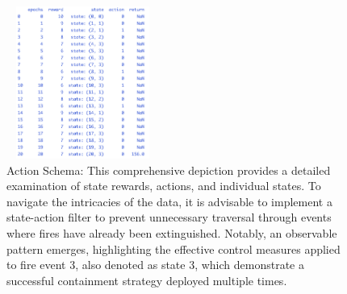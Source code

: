 \documentclass[lettersize,journal]{IEEEtran}
\begin{document}
      
        \begin{figure}
          \centering
          \includegraphics[height=5cm,width=5cm]{figs/4_2000.png}
          \caption{Action Schema: This comprehensive depiction provides a detailed examination of state rewards, actions, and individual states. To navigate the intricacies of the data, it is advisable to implement a state-action filter to prevent unnecessary traversal through events where fires have already been extinguished. Notably, an observable pattern emerges, highlighting the effective control measures applied to fire event 3, also denoted as state 3, which demonstrate a successful containment strategy deployed multiple times.}\end{figure}
        
        
      
\end{document}
